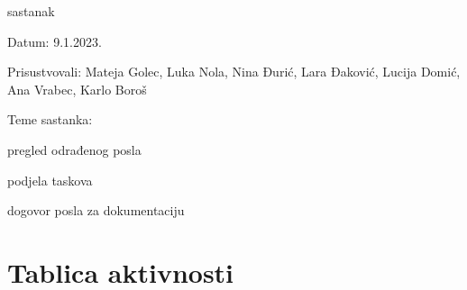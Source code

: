 \begin{packed_enum}
			\item  sastanak
			\item[] \begin{packed_item}
				\item Datum: 9.1.2023.
				\item Prisustvovali: Mateja Golec, Luka Nola, Nina Đurić, Lara Đaković, Lucija Domić, Ana Vrabec, Karlo Boroš
				\item Teme sastanka:
				\begin{packed_item}
					\item  pregled odrađenog posla
					\item  podjela taskova
					\item  dogovor posla za dokumentaciju
				\end{packed_item}
			\end{packed_item}
		\end{packed_enum}
		
		\eject
		\section*{Tablica aktivnosti}
		

